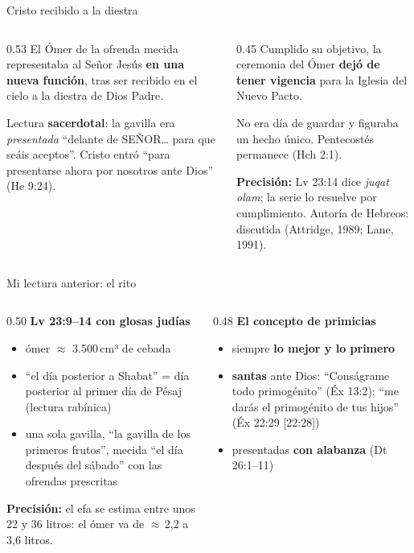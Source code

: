 \documentclass[hyperref={bookmarks=false},aspectratio=169]{beamer}
\newcommand{\SENOR}{S{\fontsize{0.78em}{1em}\selectfont EÑOR}}
\newcommand{\destacar}[1]{\textbf{\textcolor{tierraroja}{#1}}}
\newcommand{\precision}[1]{{\footnotesize\color{sepia}\textbf{Precisión:} #1}}
\begin{document}
\begin{frame}{Cristo recibido a la diestra}
\begin{columns}[t,onlytextwidth]
\begin{column}{0.53\textwidth}
\small\RaggedRight El Ómer de la ofrenda mecida representaba al Señor Jesús \destacar{en una nueva función}, tras ser recibido en el cielo a la diestra de Dios Padre.\par\smallskip
\scriptsize\RaggedRight Lectura \destacar{sacerdotal}: la gavilla era \emph{presentada} ``delante de \SENOR{}\ldots{} para que seáis aceptos''. Cristo entró ``para presentarse ahora por nosotros ante Dios'' (He 9:24).
\end{column}
\begin{column}{0.45\textwidth}
\small\RaggedRight Cumplido su objetivo, la ceremonia del Ómer \destacar{dejó de tener vigencia} para la Iglesia del Nuevo Pacto.\par\smallskip
\scriptsize\RaggedRight No era día de guardar y figuraba un hecho único. Pentecostés permanece (Hch 2:1).\par\smallskip
\precision{Lv 23:14 dice \emph{juqat olam}; la serie lo resuelve por cumplimiento. Autoría de Hebreos: discutida (Attridge, 1989; Lane, 1991).}
\end{column}
\end{columns}
\end{frame}

\begin{frame}{Mi lectura anterior: el rito}
\begin{columns}[t,onlytextwidth]
\begin{column}{0.50\textwidth}\small\RaggedRight
\textbf{\color{tierraroja}Lv 23:9--14 con glosas judías}
\begin{itemize}
\item ómer $\approx$ 3.500\,cm³ de cebada
\item ``el día posterior a Shabat'' = día posterior al primer día de Pésaj (lectura rabínica)
\item una sola gavilla, ``la gavilla de los primeros frutos'', mecida ``el día después del sábado'' con las ofrendas prescritas
\end{itemize}
\precision{el efa se estima entre unos 22 y 36 litros: el ómer va de $\approx$\,2,2 a 3,6 litros.}
\end{column}
\begin{column}{0.48\textwidth}\small\RaggedRight
\textbf{\color{tierraroja}El concepto de primicias}
\begin{itemize}
\item siempre \destacar{lo mejor y lo primero}
\item \destacar{santas} ante Dios: ``Conságrame todo primogénito'' (Éx 13:2); ``me darás el primogénito de tus hijos'' (Éx 22:29 [22:28])
\item presentadas \destacar{con alabanza} (Dt 26:1--11)
\end{itemize}
\end{column}
\end{columns}
\end{frame}
\end{document}
